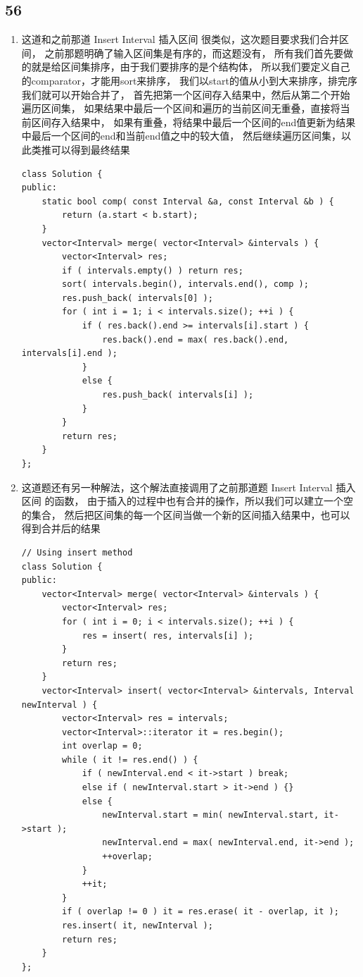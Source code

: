 \documentclass[12pt,a4paper]{article}
\begin{document}
\subsection{56}
\begin{enumerate}
\item
\begin{CJK}{UTF8}{gbsn}
这道和之前那道 Insert Interval 插入区间 很类似，这次题目要求我们合并区间，
之前那题明确了输入区间集是有序的，而这题没有，
所有我们首先要做的就是给区间集排序，由于我们要排序的是个结构体，
所以我们要定义自己的comparator，才能用sort来排序，
我们以start的值从小到大来排序，排完序我们就可以开始合并了，
首先把第一个区间存入结果中，然后从第二个开始遍历区间集，
如果结果中最后一个区间和遍历的当前区间无重叠，直接将当前区间存入结果中，
如果有重叠，将结果中最后一个区间的end值更新为结果中最后一个区间的end和当前end值之中的较大值，
然后继续遍历区间集，以此类推可以得到最终结果
\end{CJK}
\begin{lstlisting}
class Solution {
public:
	static bool comp( const Interval &a, const Interval &b ) {
		return (a.start < b.start);
	}
	vector<Interval> merge( vector<Interval> &intervals ) {
		vector<Interval> res;
		if ( intervals.empty() ) return res;
		sort( intervals.begin(), intervals.end(), comp );
		res.push_back( intervals[0] );
		for ( int i = 1; i < intervals.size(); ++i ) {
			if ( res.back().end >= intervals[i].start ) {
				res.back().end = max( res.back().end, intervals[i].end );
			}
			else {
				res.push_back( intervals[i] );
			}
		}
		return res;
	}
};
\end{lstlisting}
\item
\begin{CJK}{UTF8}{gbsn}
这道题还有另一种解法，这个解法直接调用了之前那道题 Insert Interval 插入区间 的函数，
由于插入的过程中也有合并的操作，所以我们可以建立一个空的集合，
然后把区间集的每一个区间当做一个新的区间插入结果中，也可以得到合并后的结果
\end{CJK}
\begin{lstlisting}
// Using insert method
class Solution {
public:
	vector<Interval> merge( vector<Interval> &intervals ) {
		vector<Interval> res;
		for ( int i = 0; i < intervals.size(); ++i ) {
			res = insert( res, intervals[i] );
		}
		return res;
	}
	vector<Interval> insert( vector<Interval> &intervals, Interval newInterval ) {
		vector<Interval> res = intervals;
		vector<Interval>::iterator it = res.begin();
		int overlap = 0;
		while ( it != res.end() ) {
			if ( newInterval.end < it->start ) break;
			else if ( newInterval.start > it->end ) {}
			else {
				newInterval.start = min( newInterval.start, it->start );
				newInterval.end = max( newInterval.end, it->end );
				++overlap;
			}
			++it;
		}
		if ( overlap != 0 ) it = res.erase( it - overlap, it );
		res.insert( it, newInterval );
		return res;
	}
};
\end{lstlisting}
\end{enumerate}
\end{document}
